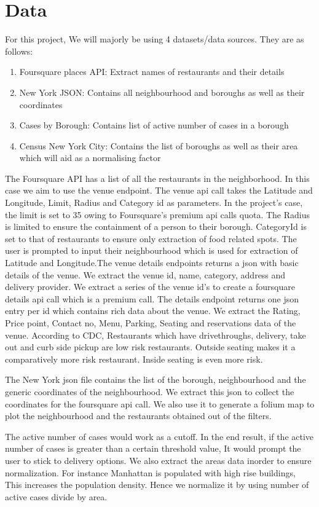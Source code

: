 \documentclass[11pt]{report}
\begin{document}
\chapter{Data}
\par For this project, We will majorly be using 4 datasets/data sources. They are as follows:
\begin{enumerate}
    \item Foursquare places API: Extract names of restaurants and their details
    \item New York JSON: Contains all neighbourhood and boroughs as well as their coordinates
    \item Cases by Borough: Contains list of active number of cases in a borough
    \item Census New York City: Contains the list of boroughs as well as their area which will aid as a normalising factor
\end{enumerate}
\par The Foursquare API has a list of all the restaurants in the neighborhood. In this case we aim to use the venue endpoint. The venue api call takes the Latitude and Longitude, Limit, Radius and Category id as parameters. In the project's case, the limit is set to 35 owing to Foursquare's premium api calls quota. The Radius is limited to ensure the containment of a person to their borough. CategoryId is set to that of restaurants to ensure only extraction of food related spots. The user is prompted to input their neighbourhood which is used for extraction of Latitude and Longitude.The venue details endpoints returns a json with basic details of the venue. We extract the venue id, name, category, address and delivery provider. We extract a series of the venue id's to create a foursquare details api call which is a premium call. The details endpoint returns one json entry per id which contains rich data about the venue. We extract the Rating, Price point, Contact no, Menu, Parking, Seating and reservations data of the venue. According to CDC, Restaurants which have drivethroughs, delivery, take out and curb side pickup are low risk restaurants\cite{restaurantconsiderations:article}. Outside seating makes it a comparatively more risk restaurant. Inside seating is even more risk. 
\par The New York json file contains the list of the borough, neighbourhood and the generic coordinates of the neighbourhood. We extract this json to collect the coordinates for the foursquare api call. We also use it to generate a folium map to plot the neighbourhood and the restaurants obtained out of the filters. 
\par The active number of cases would work as a cutoff. In the end result, if the active number of cases is greater than a certain threshold value, It would prompt the user to stick to delivery options. We also extract the areas data inorder to ensure normalization. For instance Manhattan is populated with high rise buildings, This increases the population density. Hence we normalize it by using number of active cases divide by area. 
\end{document}

